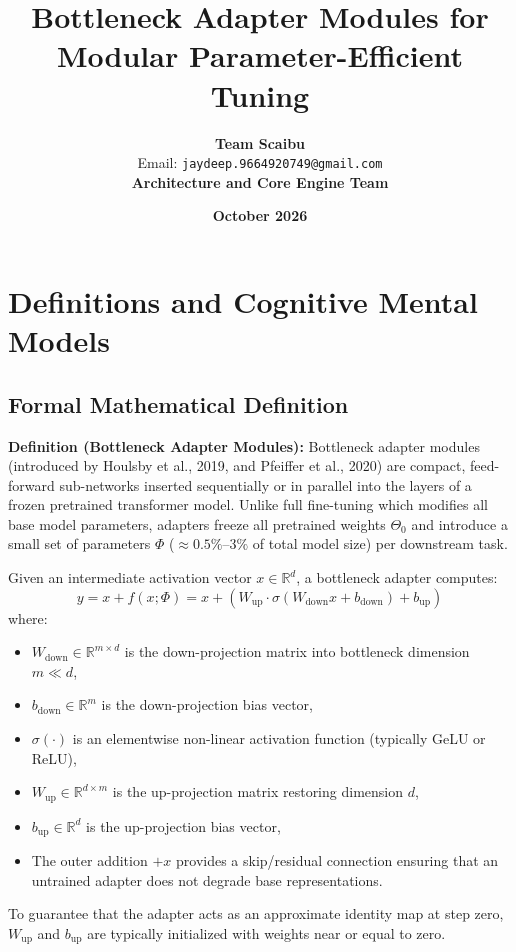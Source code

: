 \documentclass[11pt,a4paper]{article}
\title{\textbf{Bottleneck Adapter Modules for Modular Parameter-Efficient Tuning}}
\author{\textbf{Team Scaibu} \\ \small Email: \texttt{jaydeep.9664920749@gmail.com} \\ \small \textbf{Architecture and Core Engine Team}}
\date{\textbf{October 2026}}
\theoremstyle{definition}
\begin{document}
\maketitle

\section{Definitions and Cognitive Mental Models}

\subsection{Formal Mathematical Definition}
\textbf{Definition (Bottleneck Adapter Modules):}
Bottleneck adapter modules (introduced by Houlsby et al., 2019, and Pfeiffer et al., 2020) are compact, feed-forward sub-networks inserted sequentially or in parallel into the layers of a frozen pretrained transformer model. Unlike full fine-tuning which modifies all base model parameters, adapters freeze all pretrained weights $\Theta_0$ and introduce a small set of parameters $\Phi$ ($\approx 0.5\%\text{--}3\%$ of total model size) per downstream task.

Given an intermediate activation vector $x \in \mathbb{R}^d$, a bottleneck adapter computes:
{\boldmath
\begin{equation}
y = x + f(x; \Phi) = x + \left( W_{\text{up}} \cdot \sigma(W_{\text{down}} x + b_{\text{down}}) + b_{\text{up}} \right)
\end{equation}
}
where:
\begin{itemize}
    \item $W_{\text{down}} \in \mathbb{R}^{m \times d}$ is the down-projection matrix into bottleneck dimension $m \ll d$,
    \item $b_{\text{down}} \in \mathbb{R}^m$ is the down-projection bias vector,
    \item $\sigma(\cdot)$ is an elementwise non-linear activation function (typically GeLU or ReLU),
    \item $W_{\text{up}} \in \mathbb{R}^{d \times m}$ is the up-projection matrix restoring dimension $d$,
    \item $b_{\text{up}} \in \mathbb{R}^d$ is the up-projection bias vector,
    \item The outer addition $+ x$ provides a skip/residual connection ensuring that an untrained adapter does not degrade base representations.
\end{itemize}
To guarantee that the adapter acts as an approximate identity map at step zero, $W_{\text{up}}$ and $b_{\text{up}}$ are typically initialized with weights near or equal to zero.
\end{document}
